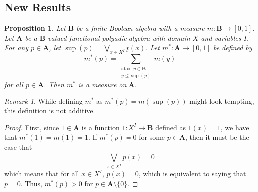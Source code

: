 \documentclass{article}
\newtheorem{proposition}{Proposition}
\theoremstyle{definition}
\theoremstyle{remark}
\newtheorem*{remark}{Remark}
\begin{document}
\subsection{New Results}

\begin{proposition}
  Let $\mathbf{B}$ be a finite Boolean algebra with a measure $m :
  \mathbf{B} \to [0, 1]$. Let $\mathbf{A}$ be a $\mathbf{B}$-valued functional
  polyadic algebra with domain $X$ and variables $I$. For any $p \in
  \mathbf{A}$, let $\sup(p) = \bigvee_{x \in X^I} p(x)$. Let $m^* : \mathbf{A}
  \to [0, 1]$ be defined by
  \[
    m^*(p) = \sum_{\substack{\text{atom } y \in \mathbf{B}:\\ y \le \sup(p)}}
    m(y)
  \]
  for all $p \in \mathbf{A}$. Then $m^*$ is a measure on $\mathbf{A}$.
\end{proposition}

\begin{remark}
  While defining $m^*$ as $m^*(p) = m(\sup(p))$ might look tempting, this
  definition is not additive.
\end{remark}

\begin{proof} %
  First, since $1 \in \mathbf{A}$ is a function $1 : X^I \to \mathbf{B}$ defined
  as $1(x) = 1$, we have that $m^*(1) = m(1) = 1$. If $m^*(p) = 0$ for some $p
  \in \mathbf{A}$, then it must be the case that
  \[
    \bigvee_{x \in X^I} p(x) = 0
  \]
  which means that for all $x \in X^I$, $p(x) = 0$, which is equivalent to
  saying that $p = 0$. Thus, $m^*(p) > 0$ for $p \in \mathbf{A} \setminus \{ 0
  \}$.
\end{proof}




\end{document}
